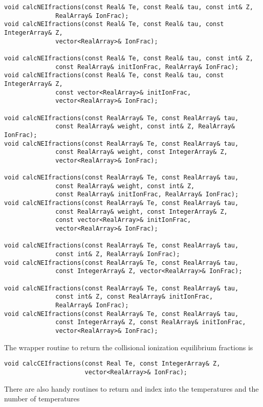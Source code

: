 \documentclass[11pt]{book}
\begin{document}
\begin{verbatim}
void calcNEIfractions(const Real& Te, const Real& tau, const int& Z, 
		      RealArray& IonFrac);
void calcNEIfractions(const Real& Te, const Real& tau, const IntegerArray& Z, 
		      vector<RealArray>& IonFrac);

void calcNEIfractions(const Real& Te, const Real& tau, const int& Z, 
		      const RealArray& initIonFrac, RealArray& IonFrac);
void calcNEIfractions(const Real& Te, const Real& tau, const IntegerArray& Z, 
		      const vector<RealArray>& initIonFrac, 
		      vector<RealArray>& IonFrac);

void calcNEIfractions(const RealArray& Te, const RealArray& tau, 
		      const RealArray& weight, const int& Z, RealArray& IonFrac);
void calcNEIfractions(const RealArray& Te, const RealArray& tau, 
		      const RealArray& weight, const IntegerArray& Z, 
		      vector<RealArray>& IonFrac);

void calcNEIfractions(const RealArray& Te, const RealArray& tau, 
		      const RealArray& weight, const int& Z, 
		      const RealArray& initIonFrac, RealArray& IonFrac);
void calcNEIfractions(const RealArray& Te, const RealArray& tau, 
		      const RealArray& weight, const IntegerArray& Z, 
		      const vector<RealArray>& initIonFrac, 
		      vector<RealArray>& IonFrac);

void calcNEIfractions(const RealArray& Te, const RealArray& tau, 
		      const int& Z, RealArray& IonFrac);
void calcNEIfractions(const RealArray& Te, const RealArray& tau, 
		      const IntegerArray& Z, vector<RealArray>& IonFrac);

void calcNEIfractions(const RealArray& Te, const RealArray& tau, 
		      const int& Z, const RealArray& initIonFrac, 
		      RealArray& IonFrac);
void calcNEIfractions(const RealArray& Te, const RealArray& tau, 
		      const IntegerArray& Z, const RealArray& initIonFrac, 
		      vector<RealArray>& IonFrac);
\end{verbatim}

The wrapper routine to return the collisional ionization equilibrium
fractions is

\begin{verbatim}
void calcCEIfractions(const Real Te, const IntegerArray& Z, 
                      vector<RealArray>& IonFrac);
\end{verbatim}

There are also handy routines to return and index into the
temperatures and the number of temperatures
\end{document}
